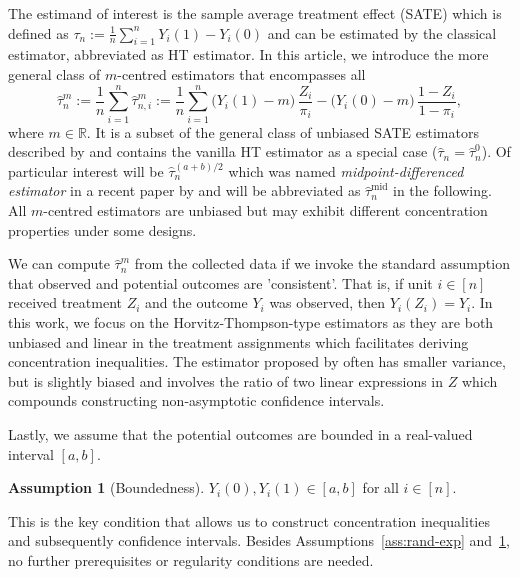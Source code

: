 \documentclass[aos]{imsart2}
\theoremstyle{plain}
\theoremstyle{definition}
\newtheorem{assumption}{Assumption}
\newcommand{\R}{\mathbb{R}}
\newcommand{\tauh}{\hat{\tau}}
\newcommand{\tauhm}{\hat{\tau}^{\mathrm{mid}}}
\begin{document}
The estimand of interest is the sample average treatment effect (SATE) which is defined as $\tau_n := \frac{1}{n} \sum_{i=1}^n Y_i(1) - Y_i(0)$ and can be estimated by the classical \citet{horvitz_generalization_1952} estimator, abbreviated as HT estimator. In this article, we introduce the more general class of $m$-centred estimators that encompasses all
\begin{equation*}
    \tauh_n^{m} := \frac{1}{n} \sum_{i=1}^n \tauh^m_{n,i} := \frac{1}{n} \sum_{i=1}^n \big(Y_i(1)-m\big)\, \frac{Z_i}{\pi_i}-\big(Y_i(0)-m\big)\, \frac{1-Z_i}{1-\pi_i},
\end{equation*}
where $m \in\R$. It is a subset of the general class of unbiased SATE estimators described by \citet{aronow_class_2013} and contains the vanilla HT estimator as a special case ({$\tauh_n=\tauh_n^0$}). Of particular interest will be $\tauh^{(a+b)/2}_n$ which was named \emph{midpoint-differenced estimator} in a recent paper by \citet{aronow_minimax_2026} and will be abbreviated as $\tauhm_n$ in the following. All $m$-centred estimators are unbiased but may exhibit different concentration properties under some designs.

We can compute $\tauh^m_n$ from the collected data if we invoke the standard assumption that observed and potential outcomes are 'consistent'. That is, if unit $i \in [n]$ received treatment $Z_i$ and the outcome $Y_i$ was observed, then $Y_i(Z_i) = Y_i$. In this work, we focus on the Horvitz-Thompson-type estimators as they are both unbiased and linear in the treatment assignments which facilitates deriving concentration inequalities. The estimator proposed by \citet{hajek_1958,hajek_comment_1971} often has smaller variance, but is slightly biased and involves the ratio of two linear expressions in $Z$ which compounds constructing non-asymptotic confidence intervals.

Lastly, we assume that the potential outcomes are bounded in a real-valued interval $[a,b]$.
\begin{assumption}[Boundedness]\label{ass:bounded}
    $Y_i(0),Y_i(1) \in [a,b]$ for all $i \in [n]$.
\end{assumption}
This is the key condition that allows us to construct concentration inequalities and subsequently confidence intervals. Besides Assumptions~\ref{ass:rand-exp} and~\ref{ass:bounded}, no further prerequisites or regularity conditions are needed.
\end{document}

